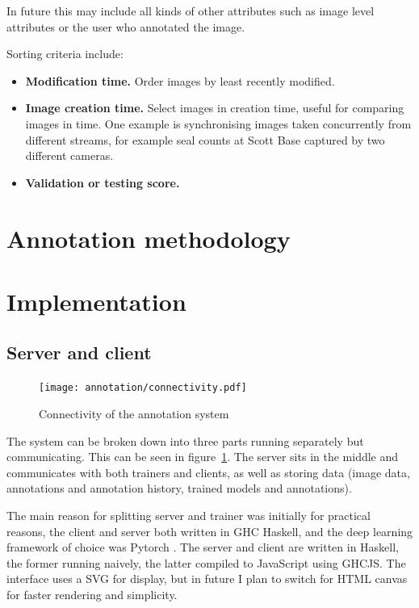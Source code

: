 In future this may include all kinds of other attributes such as image level attributes or the user who annotated the image.

Sorting criteria include:

\begin{itemize}
    \item {\bf Modification time.}
Order images by least recently modified.
    \item {\bf Image creation time. }
Select images in creation time, useful for comparing images in time. One example is synchronising images taken concurrently from different streams, for example seal counts at Scott Base captured by two different cameras.
    \item {\bf Validation or testing score. }


\end{itemize}


\section{Annotation methodology}
\label{sec:annotation_methodology}



\section {Implementation}

\subsection{Server and client}

\begin{figure}[h!]
  \centering
  \texttt{[image: annotation/connectivity.pdf]}
  \caption{Connectivity of the annotation system}  
  \label{fig:connectivity}
\end{figure}

The system can be broken down into three parts running separately but communicating. This can be seen in figure~\ref{fig:connectivity}. The server sits in the middle and communicates with both trainers and clients, as well as storing data (image data, annotations and annotation history, trained models and annotations).

The main reason for splitting server and trainer was initially for practical reasons, the client and server both written in \gls{GHC} Haskell, and the deep learning framework of choice was Pytorch \cite{Paszke2017}. The server and client are written in Haskell, the former running naively, the latter compiled to JavaScript using \gls{GHCJS}. The interface uses a \gls{SVG} for display, but in future I plan to switch for \gls{HTML} canvas for faster rendering and simplicity.

